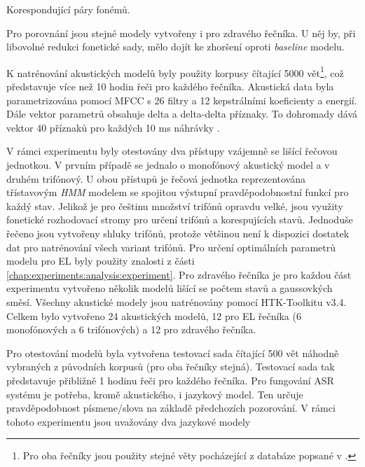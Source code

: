 \begin{table}[htpb]
  \centering
  \def\arraystretch{1.5}
  \caption{Korespondující páry fonémů.}
  \label{tab:experiments:analysis:reduction:pairs}
\end{table}

\noindent Pro porovnání jsou stejné modely vytvořeny i pro zdravého řečníka. U něj by, při libovolné redukci fonetické sady, mělo dojít ke zhoršení oproti \textit{baseline} modelu.

K natrénování akustických modelů byly použity korpusy čítající 5000 vět\footnote{Pro oba řečníky jsou použity stejné věty pocházející z databáze popsané v \cite{Radova2000}.}, což představuje více než 10 hodin řeči pro každého řečníka. Akustická data byla parametrizována pomocí MFCC s 26 filtry a 12 kepstrálními koeficienty a energií. Dále vektor parametrů obsahuje delta a delta-delta příznaky. To dohromady dává vektor 40 příznaků pro každých 10 ms náhrávky \cite{Psutka2007}.

V rámci experimentu byly otestovány dva přístupy vzájemně se lišící řečovou jednotkou. V prvním případě se jednalo o monofónový akustický model a v druhém trifónový. U obou přístupů je řečová jednotka reprezentována třístavovým \textit{HMM} modelem se spojitou výstupní pravděpodobnostní funkcí pro každý stav. Jelikož je pro češtinu množství trifónů opravdu velké, jsou využity fonetické rozhodovací stromy pro určení trifónů a korespujících stavů. Jednoduše řečeno jsou vytvořeny shluky trifónů, protože většinou není k dispozici dostatek dat pro natrénování všech variant trifónů. Pro určení optimálních parametrů modelu pro EL byly použity znalosti z části \ref{chap:experiments:analysis:experiment}. Pro zdravého řečníka je pro každou část experimentu vytvořeno několik modelů lišící se počtem stavů a gaussovkých směsí. Všechny akustické modely jsou natrénovány pomocí HTK-Toolkitu v3.4. Celkem bylo vytvořeno 24 akustických modelů, 12 pro EL řečníka (6 monofónových a 6 trifónových) a 12 pro zdravého řečníka.

Pro otestování modelů byla vytvořena testovací sada čítající 500 vět náhodně vybraných z původních korpusů (pro oba řečníky stejná). Testovací sada tak představuje přibližně 1 hodinu řeči pro každého řečníka. Pro fungování ASR systému je potřeba, kromě akustického, i jazykový model. Ten určuje pravděpodobnost písmene/slova na základě předchozích pozorování. V rámci tohoto experimentu jsou uvažovány dva jazykové modely

